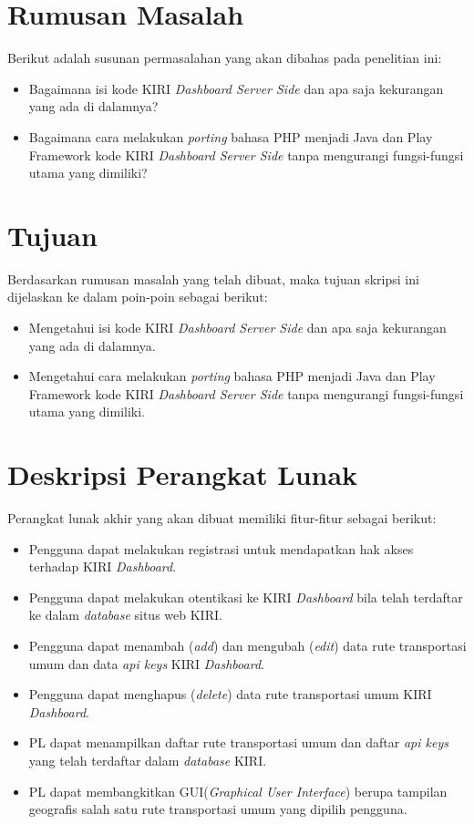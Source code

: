 \documentclass[a4paper,twoside]{article}
\begin{document}
\section{Rumusan Masalah}
Berikut adalah susunan permasalahan yang akan dibahas pada penelitian ini:
	\begin{itemize}
		\item Bagaimana isi kode KIRI \textit{Dashboard Server Side} dan apa saja kekurangan yang ada di dalamnya?
		\item Bagaimana cara melakukan \textit{porting} bahasa PHP menjadi Java dan Play Framework kode KIRI \textit{Dashboard Server Side} tanpa mengurangi fungsi-fungsi utama yang dimiliki?
	\end{itemize}
	
\section{Tujuan}
Berdasarkan rumusan masalah yang telah dibuat, maka tujuan skripsi ini dijelaskan ke dalam poin-poin sebagai berikut:
	\begin{itemize}
		\item Mengetahui isi kode KIRI \textit{Dashboard Server Side} dan apa saja kekurangan yang ada di dalamnya.
		\item Mengetahui cara melakukan \textit{porting} bahasa PHP menjadi Java dan Play Framework kode KIRI \textit{Dashboard Server Side} tanpa mengurangi fungsi-fungsi utama yang dimiliki.
	\end{itemize}

\section{Deskripsi Perangkat Lunak}
Perangkat lunak akhir yang akan dibuat memiliki fitur-fitur sebagai berikut:
\begin{itemize}
	\item Pengguna dapat melakukan registrasi untuk mendapatkan hak akses terhadap KIRI \textit{Dashboard}.
	\item Pengguna dapat melakukan otentikasi ke KIRI \textit{Dashboard} bila telah terdaftar ke dalam \textit{database} situs web KIRI.
	\item Pengguna dapat menambah (\textit{add}) dan mengubah (\textit{edit}) data rute transportasi umum dan data \textit{api keys} KIRI \textit{Dashboard}.
	\item Pengguna dapat menghapus (\textit{delete}) data rute transportasi umum KIRI \textit{Dashboard}.
	\item PL dapat menampilkan daftar rute transportasi umum dan daftar \textit{api keys} yang telah terdaftar dalam \textit{database} KIRI.
	\item PL dapat membangkitkan GUI(\textit{Graphical User Interface}) berupa tampilan geografis salah satu rute transportasi umum yang dipilih pengguna.
\end{itemize}
\end{document}
